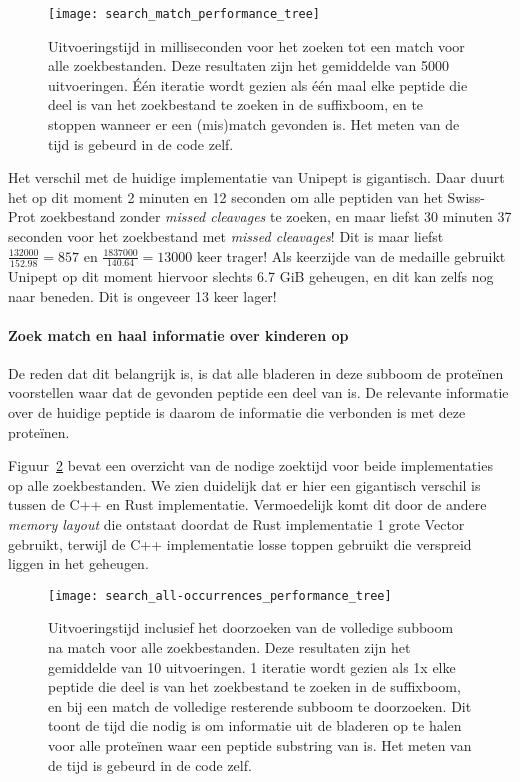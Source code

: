 \begin{figure}[H]
    \centering
    \texttt{[image: search\_match\_performance\_tree]}
    \caption{Uitvoeringstijd in milliseconden voor het zoeken tot een match voor alle zoekbestanden. Deze resultaten zijn het gemiddelde van 5000 uitvoeringen. Één iteratie wordt gezien als één maal elke peptide die deel is van het zoekbestand te zoeken in de suffixboom, en te stoppen wanneer er een (mis)match gevonden is. Het meten van de tijd is gebeurd in de code zelf.}
    \label{fig:performance_match_tree}
\end{figure}

Het verschil met de huidige implementatie van Unipept is gigantisch.
Daar duurt het op dit moment 2 minuten en 12 seconden om alle peptiden van het Swiss-Prot zoekbestand zonder \textit{missed cleavages} te zoeken,
en maar liefst 30 minuten 37 seconden voor het zoekbestand met \textit{missed cleavages}!
Dit is maar liefst $\frac{132 000}{152.98} = 857$ en $\frac{1 837 000}{140.64} = 13 000$ keer trager!
Als keerzijde van de medaille gebruikt Unipept op dit moment hiervoor slechts 6.7 GiB geheugen, en dit kan zelfs nog naar beneden.
Dit is ongeveer 13 keer lager!

\paragraph{Zoek match en haal informatie over kinderen op}
De reden dat dit belangrijk is, is dat alle bladeren in deze subboom de proteïnen voorstellen waar dat de gevonden peptide een deel van is.
De relevante informatie over de huidige peptide is daarom de informatie die verbonden is met deze proteïnen.

Figuur~\ref{fig:performance_all-occurrences_tree} bevat een overzicht van de nodige zoektijd voor beide implementaties op alle zoekbestanden.
We zien duidelijk dat er hier een gigantisch verschil is tussen de C++ en Rust implementatie.
Vermoedelijk komt dit door de andere \textit{memory layout} die ontstaat doordat de Rust implementatie 1 grote Vector gebruikt, terwijl de C++ implementatie losse toppen gebruikt die verspreid liggen in het geheugen.

\begin{figure}[H]
    \centering
    \texttt{[image: search\_all-occurrences\_performance\_tree]}
    \caption{Uitvoeringstijd inclusief het doorzoeken van de volledige subboom na match voor alle zoekbestanden. Deze resultaten zijn het gemiddelde van 10 uitvoeringen. 1 iteratie wordt gezien als 1x elke peptide die deel is van het zoekbestand te zoeken in de suffixboom, en bij een match de volledige resterende subboom te doorzoeken. Dit toont de tijd die nodig is om informatie uit de bladeren op te halen voor alle proteïnen waar een peptide substring van is. Het meten van de tijd is gebeurd in de code zelf.}
    \label{fig:performance_all-occurrences_tree}
\end{figure}


